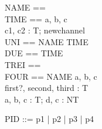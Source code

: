 \begin{zed}
\end{zed}
\begin{circus}
	\circchanset NAME == \lchanset \rchanset\\
	\circchanset TIME == \lchanset a, b, c \rchanset\\
	\circchannel [T]c1, c2 : \power T; newchannel\\
	\circchanset UNI == NAME \union TIME\\
	\circchanset DUE == \lchanset \rchanset \intersect TIME\\
	\circchanset TREI == \lchanset \rchanset \circhide \lchanset \rchanset\\
	\circchanset FOUR == NAME \circhide \lchanset a, b, c \rchanset\\
	\circchannel first?, second, third : T\\
	\circchannel a, b, c : T; d, c : NT\\
\end{circus}
\begin{zed}
   PID ::= p1 | p2 | p3 | p4
\end{zed}
